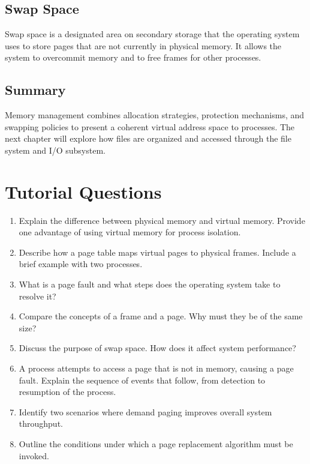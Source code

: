 \documentclass[12pt]{report}
\begin{document}
\subsection{Swap Space}
Swap space is a designated area on secondary storage that the operating system uses to store pages that are not currently in physical memory. It allows the system to overcommit memory and to free frames for other processes.

\subsection{Summary}
Memory management combines allocation strategies, protection mechanisms, and swapping policies to present a coherent virtual address space to processes. The next chapter will explore how files are organized and accessed through the file system and I/O subsystem.

\section*{Tutorial Questions}
\begin{enumerate}
\item Explain the difference between physical memory and virtual memory. Provide one advantage of using virtual memory for process isolation.
\item Describe how a page table maps virtual pages to physical frames. Include a brief example with two processes.
\item What is a page fault and what steps does the operating system take to resolve it?
\item Compare the concepts of a frame and a page. Why must they be of the same size?
\item Discuss the purpose of swap space. How does it affect system performance?
\item A process attempts to access a page that is not in memory, causing a page fault. Explain the sequence of events that follow, from detection to resumption of the process.
\item Identify two scenarios where demand paging improves overall system throughput.
\item Outline the conditions under which a page replacement algorithm must be invoked.
\end{enumerate}
\end{document}
